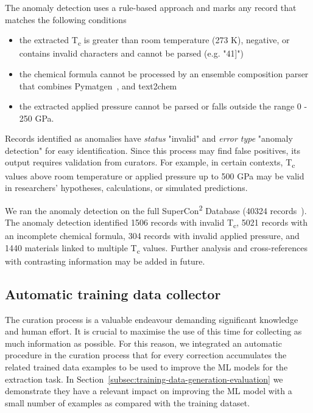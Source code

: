 \documentclass[]{interact}
\theoremstyle{plain} %
\theoremstyle{definition}
\theoremstyle{remark}
\begin{document}
The anomaly detection uses a rule-based approach and marks any record that matches the following conditions
\begin{itemize}
    \item the extracted T\textsubscript{c} is greater than room temperature (273 K), negative, or contains invalid characters and cannot be parsed (e.g. "41]")
    \item the chemical formula cannot be processed by an ensemble composition parser that combines Pymatgen~\cite{Ong2013}, and text2chem~\cite{kononova_text-mined_2019} 
    \item the extracted applied pressure cannot be parsed or falls outside the range 0 - 250 GPa.
\end{itemize}

Records identified as anomalies have \emph{status} "invalid" and \emph{error type} "anomaly detection" for easy identification.
Since this process may find false positives, its output requires validation from curators. 
For example, in certain contexts, T\textsubscript{c} values above room temperature or applied pressure up to 500 GPa may be valid in researchers' hypotheses, calculations, or simulated predictions. 

We ran the anomaly detection on the full SuperCon\textsuperscript{2} Database (40324 records~\cite{lfoppiano2023automatic}). 
The anomaly detection identified 1506 records with invalid T\textsubscript{c}, 5021 records with an incomplete chemical formula, 304 records with invalid applied pressure, and 1440 materials linked to multiple T\textsubscript{c} values. 
Further analysis and cross-references with contrasting information may be added in future. 

\subsection{Automatic training data collector}
\label{subsec:feedback-loop-training-data}
The curation process is a valuable endeavour demanding significant knowledge and human effort. 
It is crucial to maximise the use of this time for collecting as much information as possible.
For this reason, we integrated an automatic procedure in the curation process that for every correction accumulates the related trained data examples to be used to improve the ML models for the extraction task. 
In Section~\ref{subsec:training-data-generation-evaluation} we demonstrate they have a relevant impact on improving the ML model with a small number of examples as compared with the training dataset. 
\end{document}
